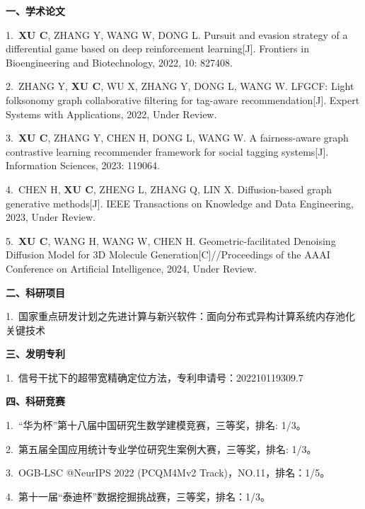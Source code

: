 \cleardoublepage
{}

\noindent {}
\vskip 10pt

\vskip 5pt
\noindent \textbf{一、学术论文}
\vskip 5pt 

1.~\textbf{XU C}, ZHANG Y, WANG W, DONG L. Pursuit and evasion strategy of a differential game based on deep reinforcement learning[J]. Frontiers in Bioengineering and Biotechnology, 2022, 10: 827408.

2.~ZHANG Y, \textbf{XU C}, WU X, ZHANG Y, DONG L, WANG W. LFGCF: Light folksonomy graph collaborative filtering for tag-aware recommendation[J]. Expert Systems with Applications, 2022, Under Review.

3.~\textbf{XU C}, ZHANG Y, CHEN H, DONG L, WANG W. A fairness-aware graph contrastive learning recommender framework for social tagging systems[J]. Information Sciences, 2023: 119064.

4.~CHEN H, \textbf{XU C}, ZHENG L, ZHANG Q, LIN X. Diffusion-based graph generative methods[J]. IEEE Transactions on Knowledge and Data Engineering, 2023, Under Review.

5.~\textbf{XU C}, WANG H, WANG W, CHEN H. Geometric-facilitated Denoising Diffusion Model for 3D Molecule Generation[C]//Proceedings of the AAAI Conference on Artificial Intelligence, 2024, Under Review.

\vskip 5pt 
\noindent \textbf{二、科研项目}
\vskip 5pt 

1.~国家重点研发计划之先进计算与新兴软件：面向分布式异构计算系统内存池化关键技术




\vskip 5pt 
\noindent \textbf{三、发明专利}
\vskip 5pt 

1.~信号干扰下的超带宽精确定位方法，专利申请号：202210119309.7

\vskip 5pt 
\noindent \textbf{四、科研竞赛}
\vskip 5pt 

1.~“华为杯”第十八届中国研究生数学建模竞赛，三等奖，排名: 1/3。

2.~第五届全国应用统计专业学位研究生案例大赛，三等奖，排名: 1/3。

3.~OGB-LSC @NeurIPS 2022 (PCQM4Mv2 Track)，NO.11，排名：1/5。

4.~第十一届“泰迪杯”数据挖掘挑战赛，三等奖，排名：1/3。
\newpage